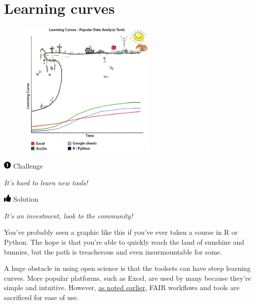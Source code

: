 \documentclass[
  letterpaper,
  DIV=11,
  numbers=noendperiod]{scrreprt}
\begin{document}
\hypertarget{learning-curves}{%
\section{Learning curves}\label{learning-curves}}

\begin{figure}

{\centering \includegraphics[width=0.6\textwidth,height=\textheight]{./img/challenge.png}

}

\end{figure}

\includegraphics[width=1em,height=1em]{./implement_files/figure-pdf/fa-icon-e38cc40f3c6469ef5f44a7764a5c5910.pdf}
Challenge

\emph{It's hard to learn new tools!}

\includegraphics[width=1em,height=1em]{./implement_files/figure-pdf/fa-icon-e4ee65476be467d7be8a1ae9cb02ffda.pdf}
Solution

\emph{It's an investment, look to the community!}

You've probably seen a graphic like this if you've ever taken a course
in R or Python. The hope is that you're able to quickly reach the land
of sunshine and bunnies, but the path is treacherous and even
insurmountable for some.

A huge obstacle in using open science is that the toolsets can have
steep learning curves. More popular platforms, such as Excel, are used
by many because they're simple and intuitive. However,
\protect\hyperlink{tidy}{as noted earlier}, FAIR workflows and tools are
sacrificed for ease of use.
\end{document}
